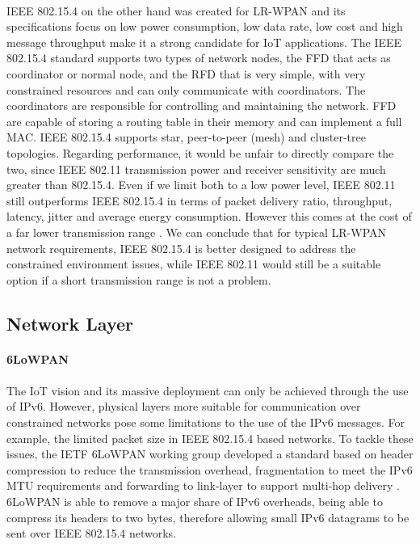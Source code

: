 \paragraph{}
IEEE 802.15.4 \cite{IEEEComputerSociety2011} on the other hand was created for \gls{LR-WPAN} and its specifications focus on low power consumption, low data rate, low cost and high message throughput make it a strong candidate for \gls{IoT} applications.
	The IEEE 802.15.4 standard supports two types of network nodes, the \gls{FFD} that acts as coordinator or normal node, and the \gls{RFD} that is very simple, with very constrained resources and can only communicate with coordinators. The coordinators are responsible for controlling and maintaining the network. \gls{FFD} are capable of storing a routing table in their memory and can implement a full \gls{MAC}.
	IEEE 802.15.4 supports star, peer-to-peer (mesh) and cluster-tree topologies.
	Regarding performance, it would be unfair to directly compare the two, since IEEE 802.11 transmission power and receiver sensitivity are much greater than 802.15.4. Even if we limit both to a low power level, IEEE 802.11 still outperforms IEEE 802.15.4 in terms of packet delivery ratio, throughput, latency, jitter and average energy consumption. However this comes at the cost of a far lower transmission range \cite{Transmission2011}.
	We can conclude that for typical \gls{LR-WPAN} network requirements, IEEE 802.15.4 is better designed to address the constrained environment issues, while IEEE 802.11 would still be a suitable option if a short transmission range is not a problem.

\subsection{Network Layer}
\label{sec:network_layer}

\paragraph{\textbf{6LoWPAN}}
\paragraph{}
	The \gls{IoT} vision and its massive deployment can only be achieved through the use of IPv6. However, physical layers more suitable for communication over constrained networks pose some limitations to the use of the IPv6 messages. For example, the limited packet size in IEEE 802.15.4 based networks. To tackle these issues, the \gls{IETF} \gls{6LoWPAN} \cite{Shelby2012} working group developed a standard based on header compression to reduce the transmission overhead, fragmentation to meet the IPv6 \gls{MTU} requirements and forwarding to link-layer to support multi-hop delivery \cite{Hui2008}.
	\gls{6LoWPAN} is able to remove a major share of IPv6 overheads, being able to compress its headers to two bytes, therefore allowing small IPv6 datagrams to be sent over IEEE 802.15.4 networks. 
	
